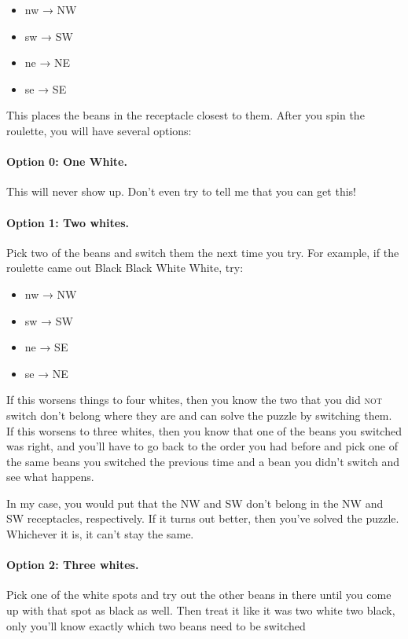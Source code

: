 \documentclass[10pt,twoside,openright]{report}
\providecommand{\tightlist}{%
  \setlength{\itemsep}{0pt}\setlength{\parskip}{0pt}}
\let\oldparagraph\paragraph
\renewcommand{\paragraph}[1]{\oldparagraph{#1}\mbox{}\nopagebreak}
\newcommand\textlcsc[1]{\texorpdfstring{\textsc{\MakeLowercase{#1}}}{#1}}
\begin{document}
%
\begin{itemize}
  \tightlist
\item
  nw → NW
\item
  sw → SW
\item
  ne → NE
\item
  se → SE
\end{itemize}

This places the beans in the receptacle closest to them. After you spin
the roulette, you will have several options:

\paragraph{Option 0: One White.} This will never show up. Don't even try to
tell me that you can get this!

\paragraph{Option 1: Two whites.} Pick two of the beans and switch them the
next time you try. For example, if the roulette came out Black Black White
White, try:%
%
\begin{itemize}
\tightlist
\item
  nw → NW
\item
  sw → SW
\item
  ne → SE
\item
  se → NE
\end{itemize}

If this worsens things to four whites, then you know the two that you did
\textlcsc{NOT} switch don't belong where they are and can solve the puzzle by
switching them. If this worsens to three whites, then you know that one of
the beans you switched was right, and you'll have to go back to the order you
had before and pick one of the same beans you switched the previous time and
a bean you didn't switch and see what happens.

In my case, you would put that the NW and SW don't belong in the NW and SW
receptacles, respectively. If it turns out better, then you've solved the
puzzle. Whichever it is, it can't stay the same.

\paragraph{Option 2: Three whites.} Pick one of the white spots and try out
the other beans in there until you come up with that spot as black as
well. Then treat it like it was two white two black, only you'll know exactly
which two beans need to be switched
\end{document}
